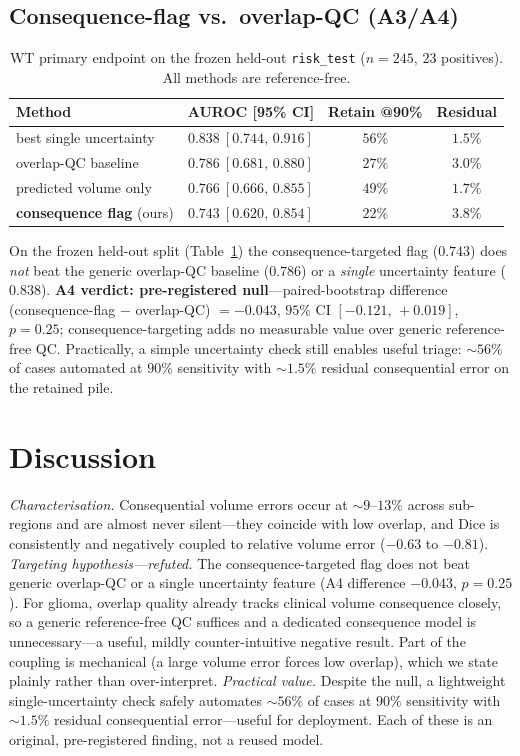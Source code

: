 \documentclass[conference]{IEEEtran}
\begin{document}
\subsection{Consequence-flag vs.\ overlap-QC (A3/A4)}
\begin{table}[t]
\centering
\caption{WT primary endpoint on the frozen held-out \texttt{risk\_test}
($n{=}245$, $23$ positives). All methods are reference-free.}
\label{tab:flag}
\footnotesize
\begin{tabular}{@{}lccc@{}}
\toprule
Method & AUROC [95\% CI] & Retain @90\% & Residual \\
\midrule
best single uncertainty      & $0.838\ [0.744,\,0.916]$ & $56\%$ & $1.5\%$ \\
overlap-QC baseline          & $0.786\ [0.681,\,0.880]$ & $27\%$ & $3.0\%$ \\
predicted volume only        & $0.766\ [0.666,\,0.855]$ & $49\%$ & $1.7\%$ \\
\textbf{consequence flag} (ours) & $0.743\ [0.620,\,0.854]$ & $22\%$ & $3.8\%$ \\
\bottomrule
\end{tabular}
\end{table}

On the frozen held-out split (Table~\ref{tab:flag}) the consequence-targeted
flag ($0.743$) does \emph{not} beat the generic overlap-QC baseline ($0.786$) or
a \emph{single} uncertainty feature ($0.838$). \textbf{A4 verdict: pre-registered
null}---paired-bootstrap difference (consequence-flag $-$ overlap-QC) $=-0.043$,
$95\%$ CI $[-0.121,\,+0.019]$, $p{=}0.25$; consequence-targeting adds no
measurable value over generic reference-free QC. Practically, a simple
uncertainty check still enables useful triage: ${\sim}56\%$ of cases automated at
$90\%$ sensitivity with ${\sim}1.5\%$ residual consequential error on the
retained pile.

\section{Discussion}
\emph{Characterisation.} Consequential volume errors occur at ${\sim}9$--$13\%$
across sub-regions and are almost never silent---they coincide with low overlap,
and Dice is consistently and negatively coupled to relative volume error
($-0.63$ to $-0.81$).
\emph{Targeting hypothesis---refuted.} The consequence-targeted flag does not
beat generic overlap-QC or a single uncertainty feature (A4 difference $-0.043$,
$p{=}0.25$). For glioma, overlap quality already tracks clinical volume
consequence closely, so a generic reference-free QC suffices and a dedicated
consequence model is unnecessary---a useful, mildly counter-intuitive negative
result. Part of the coupling is mechanical (a large volume error forces low
overlap), which we state plainly rather than over-interpret.
\emph{Practical value.} Despite the null, a lightweight single-uncertainty check
safely automates ${\sim}56\%$ of cases at $90\%$ sensitivity with ${\sim}1.5\%$
residual consequential error---useful for deployment. Each of these is an
original, pre-registered finding, not a reused model.
\end{document}
